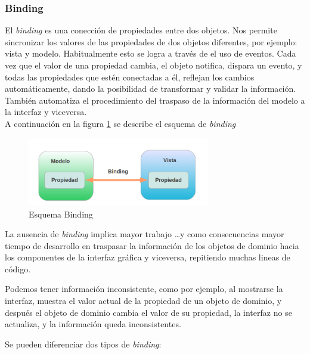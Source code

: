 

\subsubsection{Binding}

	El \emph{binding} es una conección de propiedades entre dos objetos. 
	Nos permite sincronizar los valores de las propiedades de dos objetos
	diferentes, por ejemplo: vista y modelo. Habitualmente esto se logra a través de
	el uso de eventos.
	Cada vez que el valor de una propiedad cambia, el objeto notifica, dispara un
	evento, y todas las propiedades que estén conectadas a él,
	reflejan los cambios automáticamente, dando la posibilidad de transformar y
	validar la información.\\
	También automatiza el procedimiento del traspaso de la información del
	modelo a la interfaz y viceversa.\\
	
	A continuación en la figura \ref{binding} se describe el esquema de
		\emph{binding}
		
		\begin{figure}[h]
			\centering
			\includegraphics[width=300px]{img/binding}
			\caption{Esquema Binding}
			\label{binding}
		\end{figure}
		
		\bigskip
	
	La ausencia de \emph{binding} implica mayor trabajo \ldots y como consecuencias
	 mayor tiempo de desarrollo en  traspasar la información de los
	objetos de dominio hacia los componentes de la interfaz gráfica y viceversa, repitiendo muchas lineas de código.
	
	Podemos tener información inconsistente, como por ejemplo, al mostrarse la interfaz,
	muestra el valor actual de la propiedad de un objeto de dominio, y después el
	objeto de dominio cambia el valor de su propiedad, la interfaz no se actualiza,
	y la información queda inconsistentes.
	
	\bigskip
	
	Se pueden diferenciar dos tipos de \emph{binding}:
	
